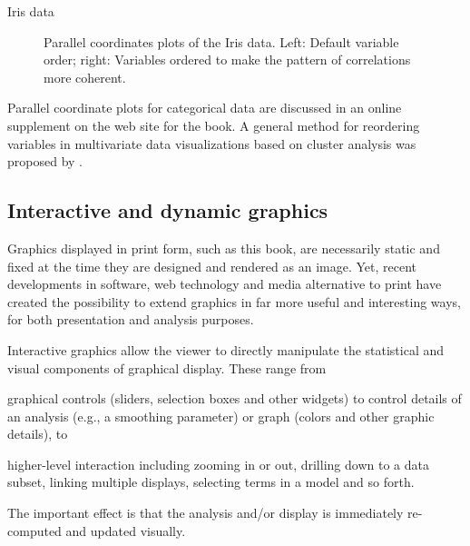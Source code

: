\documentclass[10pt,krantz2]{krantz}\usepackage[]{graphicx}\usepackage[]{color}
\newenvironment{knitrout}{}{} %
\renewenvironment{knitrout}{\small\renewcommand{\baselinestretch}{.85}}{} %
\begin{document}
\begin{Example}{Iris data}
\begin{knitrout}
\begin{figure}[!htbp]
\caption[Parallel coordinates plots of the Iris data]{Parallel coordinates plots of the Iris data. Left: Default variable order; right: Variables ordered to make the pattern of correlations more coherent.\label{fig:iris-parallel}}
\end{figure}


\end{knitrout}
Parallel coordinate plots for categorical data are discussed in 
an online supplement on the web site for the book.
A general method for reordering variables in multivariate data visualizations based on
cluster analysis was proposed by \citet{Hurley:2004}.


\end{Example}

\subsection{Interactive and dynamic graphics}\label{sec:intro-interactive}


Graphics displayed in print form, such as this book, are necessarily static
and fixed at the time they are designed and rendered as an image.
Yet, recent developments in software, web technology and media
alternative to print have created the possibility to extend graphics
in far more useful and interesting ways, for both presentation
and analysis purposes.

Interactive graphics
allow the viewer to directly manipulate the
statistical and visual components of graphical display.  These
range from
\begin{itemize*}
\item graphical controls (sliders, selection boxes and other widgets)
to control details of an analysis (e.g., a smoothing parameter) or graph
(colors and other graphic details), to
\item higher-level interaction including zooming in or out,
drilling down to a data subset,
linking multiple displays, selecting terms in a model and so forth.
\end{itemize*}
The important effect is that the analysis and/or display is immediately
re-computed and updated visually.
\end{document}
